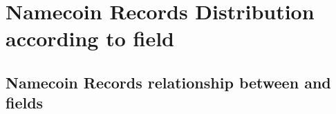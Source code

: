 \chapter{Namecoin Records Distribution according to  field}

\lstset{language=make}

\section{Namecoin Records relationship between   and  fields}
\label{appendix:distribution-lbl}




